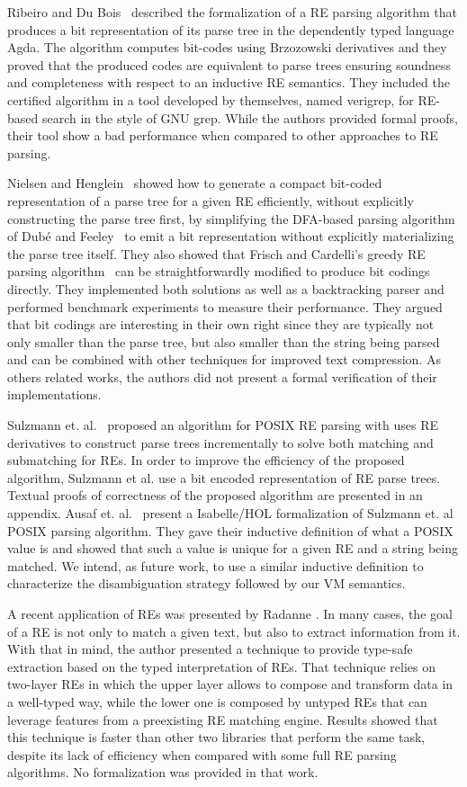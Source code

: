 \documentclass[review]{elsarticle}
\theoremstyle{definition}
\begin{document}
Ribeiro and Du Bois~\cite{Ribeiro2017} described the formalization of a RE parsing algorithm that produces a bit representation of its parse tree in the dependently typed language Agda. The algorithm computes bit-codes using Brzozowski derivatives and they proved that the produced codes are equivalent to parse trees ensuring soundness and completeness with respect to an inductive RE semantics. They included the certified algorithm in a tool developed by themselves, named verigrep, for RE-based search in the style of GNU grep. While the authors provided formal proofs, their tool show a bad performance when compared to other approaches to RE parsing.

Nielsen and Henglein~\cite{Lasse2011} showed how to generate a compact bit-coded representation of a parse tree for a given RE efficiently, without explicitly constructing the parse tree first, by simplifying the DFA-based parsing algorithm of Dubé and Feeley~\cite{Dube2000} to emit a bit representation without explicitly materializing the parse tree itself. They also showed that Frisch and Cardelli’s greedy RE parsing algorithm~\cite{Frisch2004} can be straightforwardly modified to produce bit codings directly. They implemented both solutions as well as a backtracking parser and performed benchmark experiments to measure their performance. They argued that bit codings are interesting in their own right since they are typically not only smaller than the parse tree, but also smaller than the string being parsed and can be combined with other techniques for improved text compression. As others related works, the authors did not present a formal verification of their implementations.

Sulzmann et. al.~\cite{Sulzmann14} proposed an algorithm for POSIX RE parsing with uses RE derivatives to construct parse trees incrementally to solve both matching and submatching for REs. In order to improve the efficiency of the proposed algorithm, Sulzmann et al. use a bit encoded representation of RE parse trees. Textual proofs of correctness of the proposed algorithm are presented in an appendix. Ausaf et. al.~\cite{Ausaf16} present a Isabelle/HOL formalization of Sulzmann et. al POSIX parsing algorithm. They gave their inductive definition of what a POSIX value is and showed that such a value is unique for a given RE and a string being matched. We intend, as future work, to use a similar inductive definition to characterize the disambiguation strategy followed by our VM semantics.

A recent application of REs was presented by Radanne \cite{Radanne2019}. In many cases, the goal of a RE is not only to match a given text, but also to extract information from it. With that in mind, the author presented a technique to provide type-safe extraction based on the typed interpretation of REs. That technique relies on two-layer REs in which the upper layer allows to compose and transform data in a well-typed way, while the lower one is composed by untyped REs that can leverage features from a preexisting RE matching engine. Results 
showed that this technique is faster than other two libraries that perform the same task, despite its lack of efficiency when compared with some full RE parsing algorithms. No formalization was provided in that work.
\end{document}
